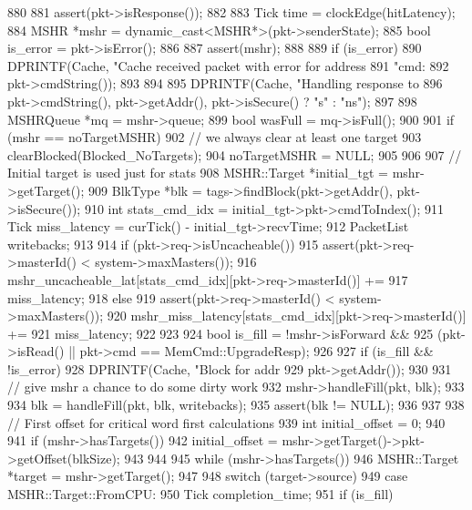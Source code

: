 \begin{DoxyCode}
880 {
881     assert(pkt->isResponse());
882 
883     Tick time = clockEdge(hitLatency);
884     MSHR *mshr = dynamic_cast<MSHR*>(pkt->senderState);
885     bool is_error = pkt->isError();
886 
887     assert(mshr);
888 
889     if (is_error) {
890         DPRINTF(Cache, "Cache received packet with error for address %
891                 "cmd: %
892                 pkt->cmdString());
893     }
894 
895     DPRINTF(Cache, "Handling response to %
896             pkt->cmdString(), pkt->getAddr(), pkt->isSecure() ? "s" : "ns");
897 
898     MSHRQueue *mq = mshr->queue;
899     bool wasFull = mq->isFull();
900 
901     if (mshr == noTargetMSHR) {
902         // we always clear at least one target
903         clearBlocked(Blocked_NoTargets);
904         noTargetMSHR = NULL;
905     }
906 
907     // Initial target is used just for stats
908     MSHR::Target *initial_tgt = mshr->getTarget();
909     BlkType *blk = tags->findBlock(pkt->getAddr(), pkt->isSecure());
910     int stats_cmd_idx = initial_tgt->pkt->cmdToIndex();
911     Tick miss_latency = curTick() - initial_tgt->recvTime;
912     PacketList writebacks;
913 
914     if (pkt->req->isUncacheable()) {
915         assert(pkt->req->masterId() < system->maxMasters());
916         mshr_uncacheable_lat[stats_cmd_idx][pkt->req->masterId()] +=
917             miss_latency;
918     } else {
919         assert(pkt->req->masterId() < system->maxMasters());
920         mshr_miss_latency[stats_cmd_idx][pkt->req->masterId()] +=
921             miss_latency;
922     }
923 
924     bool is_fill = !mshr->isForward &&
925         (pkt->isRead() || pkt->cmd == MemCmd::UpgradeResp);
926 
927     if (is_fill && !is_error) {
928         DPRINTF(Cache, "Block for addr %
929                 pkt->getAddr());
930 
931         // give mshr a chance to do some dirty work
932         mshr->handleFill(pkt, blk);
933 
934         blk = handleFill(pkt, blk, writebacks);
935         assert(blk != NULL);
936     }
937 
938     // First offset for critical word first calculations
939     int initial_offset = 0;
940 
941     if (mshr->hasTargets()) {
942         initial_offset = mshr->getTarget()->pkt->getOffset(blkSize);
943     }
944 
945     while (mshr->hasTargets()) {
946         MSHR::Target *target = mshr->getTarget();
947 
948         switch (target->source) {
949           case MSHR::Target::FromCPU:
950             Tick completion_time;
951             if (is_fill) {
}}}}
\end{DoxyCode}
